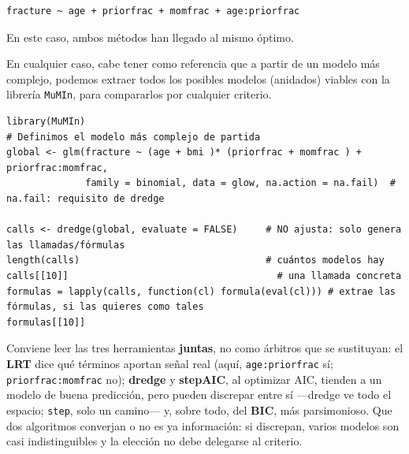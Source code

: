 \documentclass[
  letterpaper,
  DIV=11,
  numbers=noendperiod]{scrartcl}
\begin{document}
\begin{verbatim}
fracture ~ age + priorfrac + momfrac + age:priorfrac
\end{verbatim}

En este caso, ambos métodos han llegado al mismo óptimo.

\begin{tcolorbox}[enhanced jigsaw, breakable, colframe=quarto-callout-tip-color-frame, left=2mm, arc=.35mm, colbacktitle=quarto-callout-tip-color!10!white, toprule=.15mm, colback=white, coltitle=black, rightrule=.15mm, opacitybacktitle=0.6, title=\textcolor{quarto-callout-tip-color}{\faLightbulb}\hspace{0.5em}{🔧 En R. Generar modelos anidados con \texttt{MuMIn} (\texttt{dredge})}, titlerule=0mm, toptitle=1mm, bottomtitle=1mm, leftrule=.75mm, bottomrule=.15mm, opacityback=0]

En cualquier caso, cabe tener como referencia que a partir de un modelo
más complejo, podemos extraer todos los posibles modelos (anidados)
viables con la librería \texttt{MuMIn}, para compararlos por cualquier
criterio.

\begin{verbatim}
library(MuMIn)
# Definimos el modelo más complejo de partida
global <- glm(fracture ~ (age + bmi )* (priorfrac + momfrac ) + priorfrac:momfrac,
              family = binomial, data = glow, na.action = na.fail)  # na.fail: requisito de dredge

calls <- dredge(global, evaluate = FALSE)     # NO ajusta: solo genera las llamadas/fórmulas
length(calls)                                 # cuántos modelos hay
calls[[10]]                                     # una llamada concreta
formulas = lapply(calls, function(cl) formula(eval(cl))) # extrae las fórmulas, si las quieres como tales
formulas[[10]]
\end{verbatim}

\end{tcolorbox}

Conviene leer las tres herramientas \textbf{juntas}, no como árbitros
que se sustituyan: el \textbf{LRT} dice qué términos aportan señal real
(aquí, \texttt{age:priorfrac} sí; \texttt{priorfrac:momfrac} no);
\textbf{dredge} y \textbf{stepAIC}, al optimizar AIC, tienden a un
modelo de buena predicción, pero pueden discrepar entre sí ---dredge ve
todo el espacio; \texttt{step}, solo un camino--- y, sobre todo, del
\textbf{BIC}, más parsimonioso. Que dos algoritmos converjan o no es ya
información: si discrepan, varios modelos son casi indistinguibles y la
elección no debe delegarse al criterio.
\end{document}
